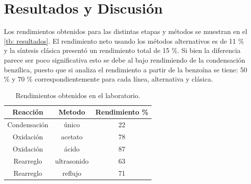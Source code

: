 \documentclass[fleqn,10pt]{SelfArx}
\begin{document}
\section{Resultados y Discusi\'on}
Los rendimientos obtenidos para las distintas etapas y m\'etodos se muestran en el \autoref{tb: resultados}. El rendimiento neto usando los m\'etodos alternativos es de 11 \% y la s\'intesis cl\'asica present\'o un rendimiento total de 15 \%. Si bien la diferencia parece ser poco significativa esto se debe al bajo rendimiendo de la condensaci\'on benz\'ilica, puesto que si analiza el rendimiento a partir de la benzo\'ina se tiene: 50 \% y 70 \% correspondientemente para cada l\'inea, alternativa y cl\'asica.
\begin{table}[h]
	\centering
	\caption{Rendimientos obtenidos en el laboratorio.}
	\label{tb: resultados}
	\begin{tabular}{ccc}
		\hline
		\textbf{Reacci\'on} & \textbf{Metodo} & \textbf{Rendimiento \%} \\
		\hline
		Condensaci\'on & \'unico & 22 \\
		Oxidaci\'on & acetato & 78 \\
		Oxidaci\'on & \'acido & 87 \\
		Rearreglo & ultrasonido & 63 \\
		Rearreglo & reflujo & 71 \\
		\hline
	\end{tabular}
\end{table}
\end{document}

